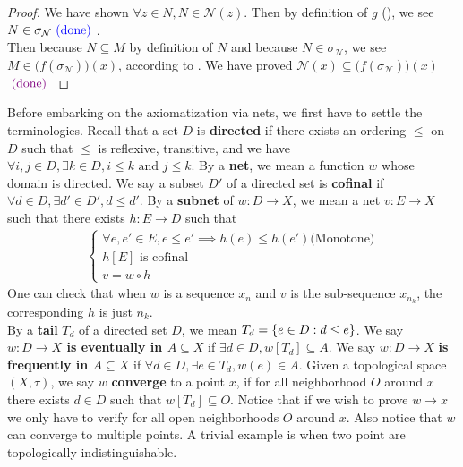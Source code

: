 \documentclass{report}
\begin{document}
\begin{proof}
We have shown $\forall z \in N, N \in \mathcal{N}(z)$. Then by definition of $g$  (), we see $N \in \sigma_\mathcal{N}\textcolor{blue}{\text{ (done) }}$.\\

Then because $N \subseteq M$ by definition of $N$ and because $N \in \sigma_{\mathcal{N}}$, we see  $M \in \big(f(\sigma_\mathcal{N}) \big)(x)$, according to . We have proved $\mathcal{N}(x)\subseteq \big(f(\sigma_\mathcal{N}) \big)(x)$$\textcolor{violet}{\text{ (done) }}$
\end{proof}
\begin{mdframed}
Before embarking on the axiomatization via nets, we first have to settle the terminologies. Recall that a set $D$ is \textbf{directed} if there exists an ordering $\leq $ on $D$ such that  $\leq $ is reflexive, transitive, and we have $\forall i,j \in D, \exists k \in D, i\leq k\text{ and }j\leq k$. By a \textbf{net}, we mean a function $w$ whose domain is directed. We say a subset $D'$ of a directed set is  \textbf{cofinal} if $\forall d \in D, \exists d' \in D', d \leq d'$. By a \textbf{subnet} of  $w:D\rightarrow X$, we mean a net  $v:E \rightarrow X$ such that there exists $h:E\rightarrow D$ such that
\begin{align*}
\begin{cases}
\forall e,e'\in E , e\leq e' \implies h(e)\leq h(e')\text{(Monotone)}\\
h[E]\text{ is cofinal }\\
v=w \circ  h
\end{cases}
\end{align*}
One can check that when $w$ is a sequence  $x_n$ and  $v$ is the sub-sequence  $x_{n_k}$, the corresponding $h$ is just $n_k$.\\

By a \textbf{tail} $T_d$ of a directed set $D$, we mean  $T_d=\{ e \in D: d\leq e \}$. We say \textbf{$w:D \rightarrow X$ is eventually in $A\subseteq X$} if $\exists d \in D, w[T_d] \subseteq A$. We say $w:D\rightarrow X$\textbf{ is frequently in $A\subseteq X$} if $\forall d\in D,\exists e \in T_d, w(e) \in A$. Given a topological space $(X,\tau)$, we say $w$  \textbf{converge} to a point $x$, if for all neighborhood $O$ around $x$ there exists $d \in D$ such that $w[T_d]\subseteq O$. Notice that if we wish to prove $w \to x$ we only have to verify for all open neighborhoods $O$ around $x$. Also notice that  $w$ can converge to multiple points. A trivial example is when two point are topologically indistinguishable.
\end{mdframed}
\end{document}
